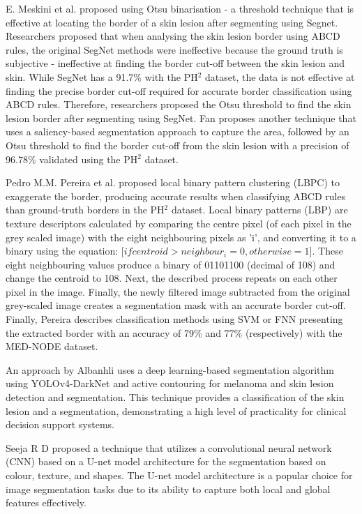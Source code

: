 E. Meskini et al. proposed using Otsu binarisation - a threshold technique that is effective at locating the border of a skin lesion after segmenting using Segnet\cite{Meskini2018}. Researchers proposed that when analysing the skin lesion border using ABCD rules, the original SegNet methods were ineffective because the ground truth is subjective - ineffective at finding the border cut-off between the skin lesion and skin. While SegNet has a 91.7\% with the PH$^2$ dataset, the data is not effective at finding the precise border cut-off required for accurate border classification using ABCD rules. Therefore, researchers proposed the Otsu threshold to find the skin lesion border after segmenting using SegNet. Fan proposes another technique that uses a saliency-based segmentation approach to capture the area, followed by an Otsu threshold\cite{Fan2017} to find the border cut-off from the skin lesion with a precision of 96.78\% validated using the PH$^2$ dataset.

Pedro M.M. Pereira et al. proposed local binary pattern clustering (LBPC) to exaggerate the border, producing accurate results when classifying ABCD rules than ground-truth borders in the PH$^2$ dataset\cite{Pereira2020}. Local binary patterns (LBP) are texture descriptors calculated by comparing the centre pixel (of each pixel in the grey scaled image) with the eight neighbouring pixels as 'i', and converting it to a binary using the equation:  [$if centroid > neighbour_i =  0, otherwise = 1$]. These eight neighbouring values produce a binary of 01101100 (decimal of 108) and change the centroid to 108. Next, the described process repeats on each other pixel in the image. Finally, the newly filtered image subtracted from the original grey-scaled image creates a segmentation mask with an accurate border cut-off. Finally, Pereira describes classification methods using SVM or FNN presenting the extracted border with an accuracy of 79\% and 77\% (respectively) with the MED-NODE dataset.

An approach by Albanhli\cite{Albahli2020} uses a deep learning-based segmentation algorithm using YOLOv4-DarkNet and active contouring for melanoma and skin lesion detection and segmentation. This technique provides a classification of the skin lesion and a segmentation, demonstrating a high level of practicality for clinical decision support systems. 

Seeja R D\cite{seeja2019} proposed a technique that utilizes a convolutional neural network (CNN) based on a U-net model architecture for the segmentation based on colour, texture, and shapes. The U-net model architecture is a popular choice for image segmentation tasks due to its ability to capture both local and global features effectively.

